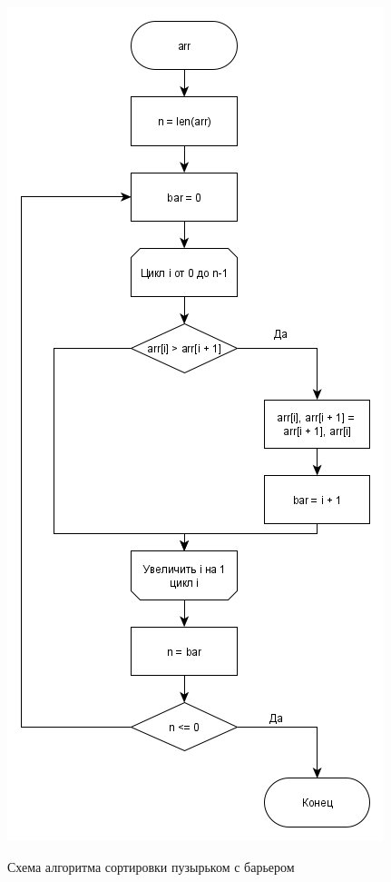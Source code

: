 \documentclass[a4paper, 14pt]{article}
\begin{document}
        	\begin{figure}[h]
        	\begin{center}
        		{\includegraphics[scale=0.41]{bubble_bar_scheme}}
        		\caption{Схема алгоритма сортировки пузырьком с барьером}
        	\end{center}
        \end{figure}
        \newpage        
\end{document}
